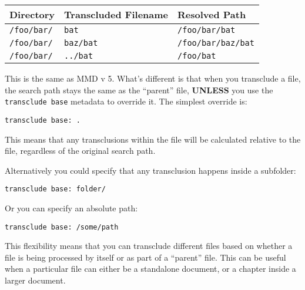 \begin{table}[htbp]
\begin{minipage}{\linewidth}
\setlength{\tymax}{0.5\linewidth}
\centering
\small
\begin{tabulary}{\textwidth}{@{}lll@{}} \toprule
 Directory	& Transcluded Filename	& Resolved Path 	\\
\midrule

 \texttt{\slash{}foo\slash{}bar\slash{}}	& \texttt{bat}	& \texttt{\slash{}foo\slash{}bar\slash{}bat}	\\
 \texttt{\slash{}foo\slash{}bar\slash{}}	& \texttt{baz\slash{}bat}	& \texttt{\slash{}foo\slash{}bar\slash{}baz\slash{}bat}	\\
 \texttt{\slash{}foo\slash{}bar\slash{}}	& \texttt{..\slash{}bat} 	& \texttt{\slash{}foo\slash{}bat}	\\
\bottomrule

\end{tabulary}
\end{minipage}
\end{table}

This is the same as \gls{MMD} v 5. What's different is that when you transclude a
file, the search path stays the same as the ``parent'' file, \textbf{UNLESS} you use
the \texttt{transclude base} metadata to override it. The simplest override is:

\begin{verbatim}
transclude base: .
\end{verbatim}

This means that any transclusions within the file will be calculated relative
to the file, regardless of the original search path.

Alternatively you could specify that any transclusion happens inside a
subfolder:

\begin{verbatim}
transclude base: folder/
\end{verbatim}

Or you can specify an absolute path:

\begin{verbatim}
transclude base: /some/path
\end{verbatim}

This flexibility means that you can transclude different files based on
whether a file is being processed by itself or as part of a ``parent'' file.
This can be useful when a particular file can either be a standalone document,
or a chapter inside a larger document.

